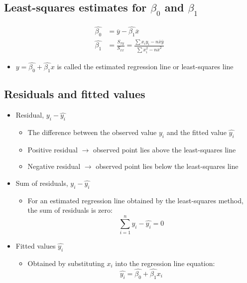 \documentclass[a4paper]{article}
\begin{document}
\subsection{Least-squares estimates for \texorpdfstring{$\beta_{0}$}{beta0} and \texorpdfstring{$\beta_{1}$}{beta1}}
\begin{align*}
    \hat{\beta_{0}} &= \overline{y}-\hat{\beta_{1}}\overline{x}\\
    \hat{\beta_{1}} &= \frac{S_{xy}}{S_{xx}} = \frac{\sum x_{i}y_{i}-n\bar{x}\bar{y}}{\sum x_{i}^{2}-n\overline{x}^{2}}
\end{align*}
\begin{itemize}
    \item $y = \hat{\beta_{0}}+\hat{\beta_{1}}x$ is called the estimated regression line or least-squares line
\end{itemize}
\newpage
\subsection{Residuals and fitted values}
\begin{itemize}
    \item Residual, $y_{i}-\hat{y_{i}}$
    \begin{itemize}[label=$\circ$]
        \item The difference between the observed value $y_{i}$ and the fitted value $\hat{y_{i}}$
        \item Positive residual $\rightarrow{}$ observed point lies above the least-squares line
        \item Negative residual $\rightarrow{}$ observed point lies below the least-squares line
    \end{itemize}
    \item Sum of residuals, $\displaystyle y_{i}-\hat{y_{i}}$
    \begin{itemize}[label=$\circ$]
        \item For an estimated regression line obtained by the least-squares method,\\ the sum of residuals is zero:
        $$
        \sum_{i=1}^{n} y_{i}-\hat{y_{i}} = 0
        $$
    \end{itemize}
    \item Fitted values $\hat{y_{i}}$
    \begin{itemize}[label=$\circ$]
        \item Obtained by substituting $x_{i}$ into the regression line equation:
        $$
        \hat{y_{i}} = \hat{\beta_{0}} + \hat{\beta_{1}}x_{i}
        $$
    \end{itemize}
\end{itemize}
\end{document}
